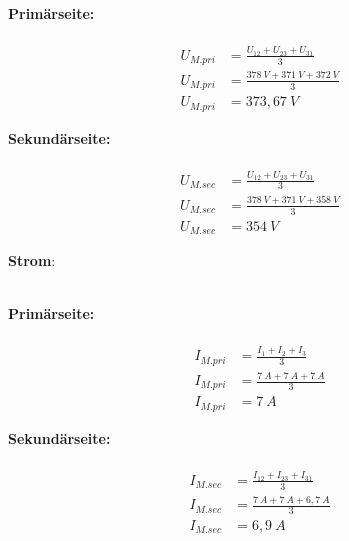 \begin{enumerate}[label=\alph*)]
\begin{tcolorbox}[colback=gray!30,
			      colframe=black,
			      width=0.9\textwidth ]
{			      \begin{minipage}{0.5\textwidth}
				      \textbf{Primärseite:}\\ \ \\
				      \begin{align*}
					      U_{M.pri} & = \frac{U_{12} + U_{23} + U_{31}}{3} \\
					      U_{M.pri} & = \frac{378\ V + 371\ V + 372\ V}{3} \\
					      U_{M.pri} & = 373,67\ V
				      \end{align*}
			      \end{minipage}\hfill
			      \begin{minipage}{0.5\textwidth}
				      \textbf{Sekundärseite:}\\ \ \\
				      \begin{align*}
					      U_{M.sec} & = \frac{U_{12} + U_{23} + U_{31}}{3} \\
					      U_{M.sec} & = \frac{378\ V + 371\ V + 358\ V}{3} \\
					      U_{M.sec} & = 354\ V
				      \end{align*}
			      \end{minipage}
		      }
	      \end{tcolorbox}

	      \textbf{Strom}:\\\ \\
	      \begin{tcolorbox}[colback=gray!30,
			      colframe=black,
			      width=0.9\textwidth,
		      ]
		      \parbox{\textwidth}{

			      \begin{minipage}{0.5\textwidth}
				      \textbf{Primärseite:}\\ \ \\
				      \begin{align*}
					      I_{M.pri} & = \frac{I_{1} + I_{2} + I_{3}}{3} \\
					      I_{M.pri} & = \frac{7\ A + 7\ A + 7\ A}{3}    \\
					      I_{M.pri} & = 7\ A
				      \end{align*}
			      \end{minipage}\hfill
			      \begin{minipage}{0.5\textwidth}
				      \textbf{Sekundärseite:}\\ \ \\
				      \begin{align*}
					      I_{M.sec} & = \frac{I_{12} + I_{23} + I_{31}}{3} \\
					      I_{M.sec} & = \frac{7\ A + 7\ A + 6,7\ A}{3}     \\
					      I_{M.sec} & = 6,9\ A
				      \end{align*}
			      \end{minipage}
		      }
	      \end{tcolorbox}


\end{enumerate}
